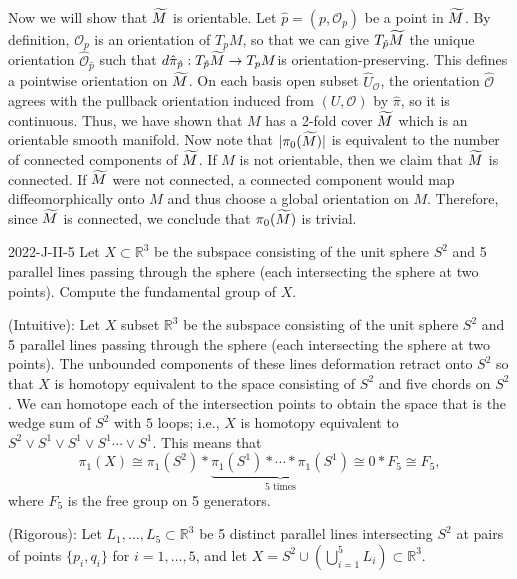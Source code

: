 \documentclass{article}
\begin{document}
	Now we will show that $\widetilde{M}$ is orientable. Let $\hat{p} = (p, \mathcal{O}_{p})$ be a point in $\widetilde{M}$. By definition, $\mathcal{O}_{p}$ is an orientation of $T_p M$, so that we can give $T_{\hat{p}}\widetilde{M}$ the unique orientation $\hat{\mathcal{O}}_{\hat{p}}$ such that $d\hat{\pi}_{\hat{p}}: T_{\hat{p}}\widetilde{M} \to T_p M$is orientation-preserving. This defines a pointwise orientation on $\widetilde{M}$. On each basis open subset $\hat{U}_{\mathcal{O}}$, the orientation $\hat{\mathcal{O}}$ agrees with the pullback orientation induced from $(U, \mathcal{O})$ by $\hat{\pi}$, so it is continuous. Thus, we have shown that $M$ has a 2-fold cover $\widetilde{M}$ which is an orientable smooth manifold. Now note that $|\pi_0(\widetilde{M})|$ is equivalent to the number of connected components of $\widetilde{M}$. If $M$ is not orientable, then we claim that $\widetilde{M}$ is connected. If $\widetilde{M}$ were not connected, a connected component would map diffeomorphically onto $M$ and thus choose a global orientation on $M$. Therefore, since $\widetilde{M}$ is connected, we conclude that $\pi_0(\widetilde{M})$ is trivial. 
	
	\begin{prb}{2022-J-II-5}
		Let $X \subset \mathbb{R}^{3}$ be the subspace consisting of the unit sphere $S^2$ and 5 parallel lines passing through the sphere (each intersecting the sphere at two points). Compute the fundamental group of $X$. 
	\end{prb}
	(Intuitive): Let $X$ subset $\mathbb{R}^{3}$ be the subspace consisting of the unit sphere $S^2$ and 5 parallel lines passing through the sphere (each intersecting the sphere at two points). The unbounded components of these lines deformation retract onto $S^2$ so that $X$ is homotopy equivalent to the space consisting of $S^2$ and five chords on $S^2$. We can homotope each of the intersection points to obtain the space that is the wedge sum of $S^2$ with $5$ loops; i.e., $X$ is homotopy equivalent to $S^{2} \vee S^1 \vee S^1 \vee S^1 \dotsm \vee S^1$. This means that 
	\begin{equation*}
		\pi_1(X) \cong \pi_{1}(S^{2}) \ast \underbrace{\pi_{1}(S^1) \ast \dotsm \ast \pi_{1}(S^1)}_{5 \text{ times}} \cong 0 \ast F_5 \cong F_5, 
	\end{equation*}
	where $F_5$ is the free group on 5 generators. 
	
	(Rigorous): Let $L_1, \dots, L_5 \subset \mathbb{R}^3$ be 5 distinct parallel lines intersecting $S^2$ at pairs of points $\{p_i, q_i\}$ for $i = 1, \dots, 5$, and let $X = S^2 \cup \left(\bigcup_{i=1}^5 L_i\right) \subset \mathbb{R}^3$.
	
\end{document}
